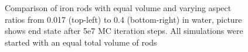 \begin{figure}[h]
\begin{minipage}[t]{0.3\textwidth}
  \end{minipage}~~~
  \begin{minipage}[t]{0.3\textwidth}
  \end{minipage}~~~
  \begin{minipage}[t]{0.3\textwidth}
  \end{minipage}
  \caption{Comparison of iron rods with equal volume and varying aspect ratios from 0.017 (top-left) to  0.4 (bottom-right) in water, picture shows end state after 5e7 MC iteration steps. All simulations were started with an equal total volume of rods}
  \label{fig:asp_vol}
\end{figure}
